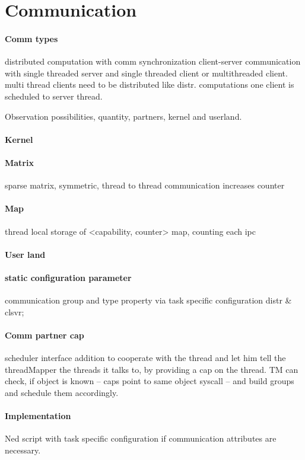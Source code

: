\section{Communication}
\label{design:comm}

\paragraph{Comm types}
distributed computation with comm synchronization
client-server communication with single threaded server and single threaded
client or multithreaded client.
multi thread clients need to be distributed like distr. computations
one client is scheduled to server thread.

Observation possibilities, quantity, partners, kernel and userland. 

\paragraph{Kernel}
\paragraph{Matrix}
sparse matrix, symmetric, thread to thread communication increases counter
\paragraph{Map}
thread local storage of <capability, counter> map, counting each \gls{ipc}

\paragraph{User land}
\paragraph{static configuration parameter}
communication group and type property via task specific configuration
distr \& clsvr;
\paragraph{Comm partner cap}
scheduler interface addition to cooperate with the thread and let him tell the
threadMapper the threads it talks to, by providing a cap on the thread.
TM can check, if object is known -- caps point to same object syscall -- and
build groups and schedule them accordingly. 


\paragraph{Implementation}
Ned script with task specific configuration if communication attributes are
necessary.
